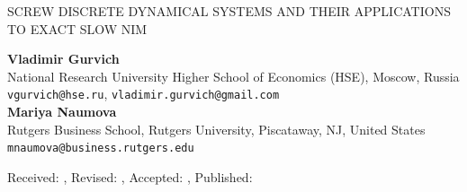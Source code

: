 \documentclass[10pt]{article}
\theoremstyle{definition}
\begin{document}
\begin{center}
\uppercase{Screw discrete dynamical systems and their 
applications to exact slow NIM} 

\vskip 20pt
{\bf Vladimir Gurvich}\\
{\smallit National Research University Higher School of Economics (HSE), Moscow, Russia}\\
{\tt vgurvich@hse.ru}, {\tt vladimir.gurvich@gmail.com}\\
\vskip 10pt
{\bf Mariya Naumova}\\
{\smallit Rutgers Business School, Rutgers University, Piscataway, NJ, United States}\\
{\tt mnaumova@business.rutgers.edu}\\
\end{center}
\vskip 20pt
\centerline{\smallit Received: , Revised: , Accepted: , Published: } 
\vskip 30pt
\end{document}
